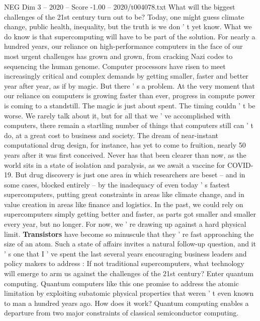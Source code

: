 \begin{textsample}{NEG Dim 3 – 2020 – Score -1.00 – 2020/t004078.txt}  \label{ex:f3_neg_069}
What will the biggest challenges of the 21st century turn out to be?
Today, one might guess climate change, public health, inequality, but the truth is we don ' t yet know.
What we do know is that supercomputing will have to be part of the solution.
For nearly a hundred years, our reliance on high-performance computers in the face of our most urgent challenges has grown and grown, from cracking Nazi codes to sequencing the human genome.
Computer processors have risen to meet increasingly critical and complex demands by getting smaller, faster and better year after year, as if by magic.
But there ' s a problem.
At the very moment that our reliance on computers is growing faster than ever, progress in compute power is coming to a standstill.
The magic is just about spent.
The timing couldn ' t be worse.
We rarely talk about it, but for all that we ' ve accomplished with computers, there remain a startling number of things that computers still can ' t do, at a great cost to business and society.
The dream of near-instant computational drug design, for instance, has yet to come to fruition, nearly 50 years after it was first conceived.
Never has that been clearer than now, as the world sits in a state of isolation and paralysis, as we await a vaccine for COVID-19.
But drug discovery is just one area in which researchers are beset -- and in some cases, blocked entirely -- by the inadequacy of even today ' s fastest supercomputers, putting great constraints in areas like climate change, and in value creation in areas like finance and logistics.
In the past, we could rely on supercomputers simply getting better and faster, as parts got smaller and smaller every year, but no longer.
For now, we ' re drawing up against a hard physical limit. \textbf{Transistors} have become so minuscule that they ' re fast approaching the size of an atom.
Such a state of affairs invites a natural follow-up question, and it ' s one that I ' ve spent the last several years encouraging business leaders and policy makers to address : If not traditional supercomputers, what technology will emerge to arm us against the challenges of the 21st century?
Enter quantum computing.
Quantum computers like this one promise to address the atomic limitation by exploiting subatomic physical properties that weren ' t even known to man a hundred years ago.
How does it work?
Quantum computing enables a departure from two major constraints of classical semiconductor computing.

\end{textsample}
